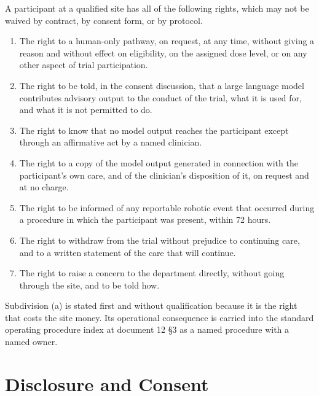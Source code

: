 A participant at a qualified site has all of the following rights, which may not
be waived by contract, by consent form, or by protocol.

\begin{enumerate}
\item The right to a human-only pathway, on request, at any time, without giving
  a reason and without effect on eligibility, on the assigned dose level, or on
  any other aspect of trial participation.

\item The right to be told, in the consent discussion, that a large language
  model contributes advisory output to the conduct of the trial, what it is used
  for, and what it is not permitted to do.

\item The right to know that no model output reaches the participant except
  through an affirmative act by a named clinician.

\item The right to a copy of the model output generated in connection with the
  participant's own care, and of the clinician's disposition of it, on request
  and at no charge.

\item The right to be informed of any reportable robotic event that occurred
  during a procedure in which the participant was present, within 72 hours.

\item The right to withdraw from the trial without prejudice to continuing care,
  and to a written statement of the care that will continue.

\item The right to raise a concern to the department directly, without going
  through the site, and to be told how.
\end{enumerate}

Subdivision (a) is stated first and without qualification because it is the
right that costs the site money. Its operational consequence is carried into
the standard operating procedure index at document 12 §3 as a named procedure
with a named owner.

\section{Disclosure and Consent}

